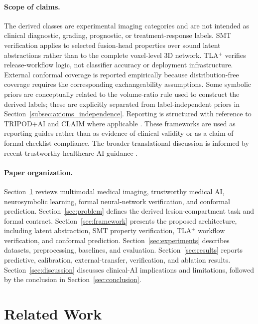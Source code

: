 \documentclass[preprint,11pt]{elsarticle}
\begin{document}
\paragraph{Scope of claims.}
The derived classes are experimental imaging categories and are not intended as clinical diagnostic, grading, prognostic, or treatment-response labels. SMT verification applies to selected fusion-head properties over sound latent abstractions rather than to the complete voxel-level 3D network. TLA$^{+}$ verifies release-workflow logic, not classifier accuracy or deployment infrastructure. External conformal coverage is reported empirically because distribution-free coverage requires the corresponding exchangeability assumptions. Some symbolic priors are conceptually related to the volume-ratio rule used to construct the derived labels; these are explicitly separated from label-independent priors in Section~\ref{subsec:axioms_independence}. Reporting is structured with reference to TRIPOD+AI and CLAIM where applicable \cite{collins2024tripod,tejani2024claim}. These frameworks are used as reporting guides rather than as evidence of clinical validity or as a claim of formal checklist compliance. The broader translational discussion is informed by recent trustworthy-healthcare-AI guidance \cite{lekadir2025future,cicek2025position,andersen2026mapping}.

\paragraph{Paper organization.}
Section~\ref{sec:related} reviews multimodal medical imaging, trustworthy medical AI, neurosymbolic learning, formal neural-network verification, and conformal prediction. Section~\ref{sec:problem} defines the derived lesion-compartment task and formal contract. Section~\ref{sec:framework} presents the proposed architecture, including latent abstraction, SMT property verification, TLA$^{+}$ workflow verification, and conformal prediction. Section~\ref{sec:experiments} describes datasets, preprocessing, baselines, and evaluation. Section~\ref{sec:results} reports predictive, calibration, external-transfer, verification, and ablation results. Section~\ref{sec:discussion} discusses clinical-AI implications and limitations, followed by the conclusion in Section~\ref{sec:conclusion}.

\section{Related Work}
\label{sec:related}
\end{document}

